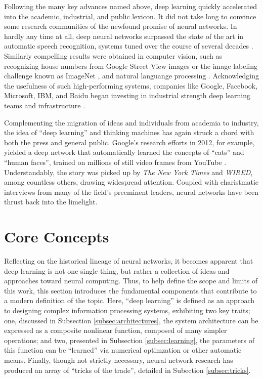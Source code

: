 Following the many key advances named above, deep learning quickly accelerated into the academic, industrial, and public lexicon.
It did not take long to convince some research communities of the newfound promise of neural networks.
In hardly any time at all, deep neural networks surpassed the state of the art in automatic speech recognition, systems tuned over the course of several decades \cite{Hinton2009}.
Similarly compelling results were obtained in computer vision, such as recognizing house numbers from Google Street View images \cite{} or the image labeling challenge known as ImageNet \cite{}, and natural languange processing \cite{Sutskever2010}.
Acknowledging the usefulness of such high-performing systems, companies like Google, Facebook, Microsoft, IBM, and Baidu began investing in industrial strength deep learning teams and infrastructure \cite{Dean2012, LeCun2014}.

Complementing the migration of ideas and individuals from academia to industry, the idea of ``deep learning'' and thinking machines has again struck a chord with both the press and general public.
Google's research efforts in 2012, for example, yielded a deep network that automatically learned the concepts of ``cats'' and ``human faces'', trained on millions of still video frames from YouTube \cite{Le2012}.
Understandably, the story was picked up by \emph{The New York Times} and \emph{WIRED}, among countless others, drawing widespread attention.
Coupled with charistmatic interviews from many of the field's preeminent leaders, neural networks have been thrust back into the limelight. %


\section{Core Concepts}
\label{sec:example}

Reflecting on the historical lineage of neural networks, it becomes apparent that deep learning is not one single thing, but rather a collection of ideas and approaches toward neural computing.
Thus, to help define the scope and limits of this work, this section introduces the fundamental components that contribute to a modern definition of the topic.
Here, ``deep learning'' is defined as an approach to designing complex information processing systems, exhibiting two key traits;
one, discussed in Subsection \ref{subsec:architectures}, the system architecture can be expressed as a composite nonlinear function, composed of many simpler operations;
and two, presented in Subsection \ref{subsec:learning}, the parameters of this function can be ``learned'' via numerical optimzation or other automatic means.
Finally, though not strictly necessary, neural network research has produced an array of ``tricks of the trade'', detailed in Subection \ref{subsec:tricks}.


